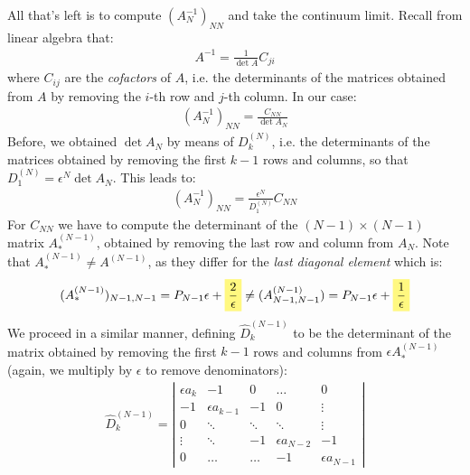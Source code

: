 \documentclass[../template.tex]{subfiles}
\begin{document}
All that's left is to compute $(A_N^{-1})_{NN}$ and take the continuum limit. Recall from linear algebra that:
\begin{align*}
    A^{-1} = \frac{1}{\operatorname{det}A } C_{ji} 
\end{align*} 
where $C_{ij}$ are the \textit{cofactors} of $A$, i.e. the determinants of the matrices obtained from $A$ by removing the $i$-th row and $j$-th column. In our case:
\begin{align*}
    (A_N^{-1})_{NN} = \frac{C_{NN}}{\operatorname{det} A_N} 
\end{align*}      
Before, we obtained $\operatorname{det} A_N$ by means of $D_k^{(N)}$, i.e. the determinants of the matrices obtained by removing the first $k-1$ rows and columns, so that $D_1^{(N)} = \epsilon^N \operatorname{det} A_N$. This leads to:
\begin{align*}
    (A_N^{-1})_{NN} = \frac{\epsilon^N}{D_1^{(N)}} C_{NN} 
\end{align*}
For $C_{NN}$ we have to compute the determinant of the $(N-1)\times (N-1)$  matrix $A_*^{(N-1)}$, obtained by removing the last row and column from $A_N$. Note that $A_*^{(N-1)} \neq A^{(N-1)}$, as they differ for the \textit{last diagonal element} which is:
\begin{align}
    (A_*^{(N-1)})_{N-1,N-1} = P_{N-1} \epsilon + \hlc{Yellow}{\frac{2}{\epsilon}} \neq (A^{(N-1)}_{N-1,N-1}) = P_{N-1} \epsilon + \hlc{Yellow}{\frac{1}{\epsilon}}  
    \label{eqn:element-difference}
\end{align} 
We proceed in a similar manner, defining $\hat{D}_k^{(N-1)}$ to be the determinant of the matrix obtained by removing the first $k-1$ rows and columns from $\epsilon A_*^{(N-1)}$ (again, we multiply by $\epsilon$ to remove denominators):
\begin{align*}
    \hat{D}_{k}^{(N-1)} = \left|\begin{array}{ccccc}
        \epsilon a_k & -1 & 0 & \dots & 0 \\ 
        -1 & \epsilon a_{k-1} & -1 & 0 & \vdots \\ 
        0 & \ddots & \ddots & \ddots & \vdots \\ 
        \vdots & \ddots & -1 & \epsilon a_{N-2} & -1 \\ 
        0 & \dots & \dots & -1 & \epsilon a_{N-1}
        \end{array}\right|
\end{align*}
\end{document}
